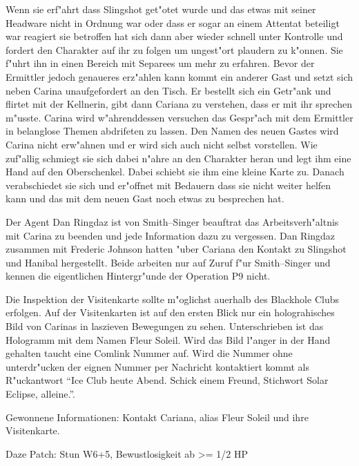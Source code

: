 
Wenn sie erf"ahrt dass Slingshot get"otet wurde und das etwas mit seiner Headware nicht in Ordnung war oder dass er sogar an einem Attentat beteiligt war reagiert sie betroffen hat sich dann aber wieder schnell unter Kontrolle und fordert den Charakter auf ihr zu folgen um ungest"ort plaudern zu k"onnen. Sie f"uhrt ihn in einen Bereich mit Separees um mehr zu erfahren. Bevor der Ermittler jedoch genaueres erz"ahlen kann kommt ein anderer Gast und setzt sich neben Carina unaufgefordert an den Tisch. Er bestellt sich ein Getr"ank und flirtet mit der Kellnerin, gibt dann Cariana zu verstehen, dass er mit ihr sprechen m"usste. Carina wird w"ahrenddessen versuchen das Gespr"ach mit dem Ermittler in belanglose Themen abdrifeten zu lassen. Den Namen des neuen Gastes wird Carina nicht erw"ahnen und er wird sich auch nicht selbst vorstellen. Wie zuf"allig schmiegt sie sich dabei n"ahre an den Charakter heran und legt ihm eine Hand auf den Oberschenkel. Dabei schiebt sie ihm eine kleine Karte zu. Danach verabschiedet sie sich und er"offnet mit Bedauern dass sie nicht weiter helfen kann und das mit dem neuen Gast noch etwas zu besprechen hat.

Der Agent {\emph{}Dan Ringdaz} ist von Smith--Singer beauftrat das Arbeitsverh"altnis mit Carina zu beenden und jede Information dazu zu vergessen. Dan Ringdaz zusammen mit Frederic Johnson hatten "uber Cariana den Kontakt zu Slingshot und Hanibal hergestellt. Beide arbeiten nur auf Zuruf f"ur Smith--Singer und kennen die eigentlichen Hintergr"unde der Operation P9 nicht.

Die Inspektion der Visitenkarte sollte m"oglichst au\3erhalb des Blackhole Clubs erfolgen. Auf der Visitenkarten ist auf den ersten Blick nur ein holograhisches Bild von Carinas in laszieven Bewegungen zu sehen. Unterschrieben ist das Hologramm mit dem Namen Fleur Soleil. Wird das Bild l"anger in der Hand gehalten taucht eine Comlink Nummer auf. Wird die Nummer ohne unterdr"ucken der eignen Nummer per Nachricht kontaktiert kommt als R"uckantwort "`Ice Club heute Abend. Schick einem Freund, Stichwort Solar Eclipse, alleine."'.

\begin{remarks}
	Gewonnene Informationen: Kontakt Cariana, alias Fleur Soleil und ihre Visitenkarte.

	Daze Patch: Stun W6+5, Bewustlosigkeit ab >= 1/2 HP
\end{remarks}


